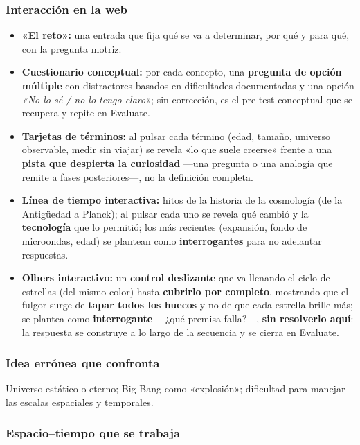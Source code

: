 \subsubsection*{Interacción en la web}

\begin{itemize}
\item \textbf{«El reto»:} una entrada que fija qué se va a determinar, por qué y para qué, con la pregunta motriz.
\item \textbf{Cuestionario conceptual:} por cada concepto, una \textbf{pregunta de opción múltiple} con distractores basados en dificultades documentadas y una opción \emph{«No lo sé / no lo tengo claro»}; sin corrección, es el pre-test conceptual que se recupera y repite en Evaluate.
\item \textbf{Tarjetas de términos:} al pulsar cada término (edad, tamaño, universo observable, medir sin viajar) se revela «lo que suele creerse» frente a una \textbf{pista que despierta la curiosidad} ---una pregunta o una analogía que remite a fases posteriores---, no la definición completa.
\item \textbf{Línea de tiempo interactiva:} hitos de la historia de la cosmología (de la Antigüedad a Planck); al pulsar cada uno se revela qué cambió y la \textbf{tecnología} que lo permitió; los más recientes (expansión, fondo de microondas, edad) se plantean como \textbf{interrogantes} para no adelantar respuestas.
\item \textbf{Olbers interactivo:} un \textbf{control deslizante} que va llenando el cielo de estrellas (del mismo color) hasta \textbf{cubrirlo por completo}, mostrando que el fulgor surge de \textbf{tapar todos los huecos} y no de que cada estrella brille más; se plantea como \textbf{interrogante} ---¿qué premisa falla?---, \textbf{sin resolverlo aquí}: la respuesta se construye a lo largo de la secuencia y se cierra en Evaluate.
\end{itemize}

\subsubsection*{Idea errónea que confronta}

Universo estático o eterno; Big Bang como «explosión»; dificultad para manejar las escalas espaciales y temporales.

\subsubsection*{Espacio--tiempo que se trabaja}

